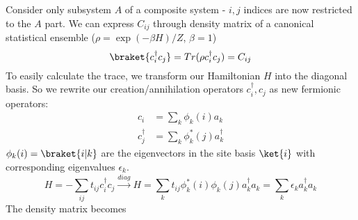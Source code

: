 Consider only subsystem $A$ of a composite system - $i,j$ indices are now restricted to the $A$ part. We can express $C_{ij}$ through density matrix of a canonical statistical ensemble ($\rho = \exp (- \beta H) / Z$, $\beta = 1$)
\begin{equation*}
\braket{c^{\dagger}_i c_j} = Tr (\rho c^{\dagger}_i c_j )= C_{ij}
\end{equation*}
To easily calculate the trace, we transform our Hamiltonian $H$ into the diagonal basis. So we rewrite our creation/annihilation operators $c^{\dagger}_i,  c_j$ as new fermionic operators:
\begin{equation}
\begin{aligned}
c_i &= \sum_k \phi_k (i) a_k \\
c_j^{\dagger} &= \sum_k  \phi_k^* (j) a_k^{\dagger} 
\end{aligned}
\end{equation}
$\phi_k (i) = \braket{i |k}$ are the eigenvectors in the site basis $\ket{i}$ with corresponding eigenvalues $\epsilon_k$.
\begin{equation}
H = - \sum_{ij} t_{ij} c^{\dagger}_i c_j \overset{diag}{\longrightarrow} H = \sum_k t_{ij} \phi_k^* (i) \phi_k (j) a_k^{\dagger} a_k = \sum_k \epsilon_k a_k^{\dagger} a_k 
\end{equation}
The density matrix becomes
